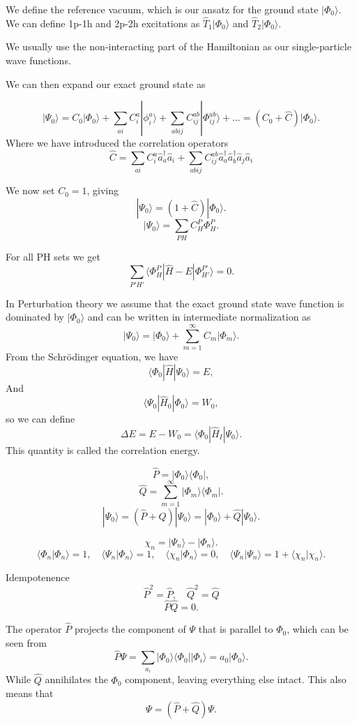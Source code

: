 \documentclass[a4paper, 11pt, notitlepage, english]{article}
\newcommand{\bra}[1]{\langle #1|}
\newcommand{\ket}[1]{|#1 \rangle}
\newcommand{\braket}[2]{\langle #1 | #2 \rangle}
\newcommand{\op}[1]{\hat{#1}}
\newcommand{\braopket}[3]{\langle #1 | {#2} | #3 \rangle}
\newcommand{\ketbra}[2]{\ket{#1}\bra{#2}}
\begin{document}
\clearpage

We define the reference vacuum, which is our ansatz for the ground state $\ket{\Phi_0}$. We can define 1p-1h and 2p-2h excitations as $\op{T}_1\ket{\Phi_0}$ and $\op{T}_2\ket{\Phi_0}$.

We usually use the non-interacting part of the Hamiltonian as our single-particle wave functions.

We can then expand our exact ground state as

$$\ket{\Psi_0} = C_0\ket{\Phi_0} + \sum_{ai}C_i^a \ket{\phi_i^a} + \sum_{abij}C_{ij}^{ab}\ket{\Phi_{ij}^{ab}} + \ldots = (C_0 + \op{C})\ket{\Phi_0}.$$
Where we have introduced the correlation operators
$$\op{C} = \sum_{ai}C_i^a \op{a}_{a}^\dagger \op{a}_i  + \sum_{abij}C_{ij}^{ab} \op{a}_{a}^\dagger \op{a}_{b}^\dagger \op{a}_j \op{a}_i $$

We now set $C_0 = 1$, giving
$$\ket{\Psi_0} = (1+\op{C})\ket{\Phi_0}.$$
$$\ket{\Psi_0} = \sum_{PH} C_{H}^P \Phi_H^P.$$

For all PH sets we get
$$\sum_{P'H'} \braopket{\Phi_H^P}{\op{H}-E}{\Phi_{H'}^{P'}} = 0.$$

In Perturbation theory we assume that the exact ground state wave function is dominated by $\ket{\Phi_0}$ and can be written in intermediate normalization as
$$\ket{\Psi_0} = \ket{\Phi_0} + \sum_{m=1}^\infty C_m \ket{\Phi_m}.$$
From the Schrödinger equation, we have
$$\braopket{\Phi_0}{\op{H}}{\Psi_0} = E,$$
And
$$\braopket{\Psi_0}{\op{H}_0}{\Phi_0} = W_0,$$
so we can define
$$\Delta E = E - W_0 = \braopket{\Phi_0}{\op{H}_I}{\Psi_0}.$$
This quantity is called the correlation energy.

$$\op{P} = \ketbra{\Phi_0}{\Phi_0},$$
$$\op{Q} = \sum_{m=1}^\infty \ketbra{\Phi_m}{\Phi_m}.$$
$$\ket{\Psi_0} = (\op{P} + \op{Q})\ket{\Psi_0} = \ket{\Phi_0} + \op{Q}\ket{\Psi_0}.$$

$$\chi_n = \ket{\Psi_n} - \ket{\Phi_n}.$$
$$\braket{\Phi_n}{\Phi_n} = 1, \quad \braket{\Psi_n}{\Phi_n} = 1, \quad \braket{\chi_n}{\Phi_n} = 0, \quad \braket{\Psi_n}{\Psi_n} = 1 + \braket{\chi_n}{\chi_n}.$$

Idempotenence
$$\op{P}^2 = \op{P}, \quad \op{Q}^2 = \op{Q}$$
$$\op{P}\op{Q} = 0. $$

The operator $\op{P}$ projects the component of $\Psi$ that is parallel to $\Phi_0$, which can be seen from
$$\op{P}\Psi = \sum_{a_i}\ketbra{\Phi_0}{\Phi_0}\ket{\Phi_i} = a_0\ket{\Phi_0}.$$
While $\op{Q}$ annihilates the $\Phi_0$ component, leaving everything else intact. This also means that
$$\Psi = (\op{P} + \op{Q})\Psi.$$
\end{document}
